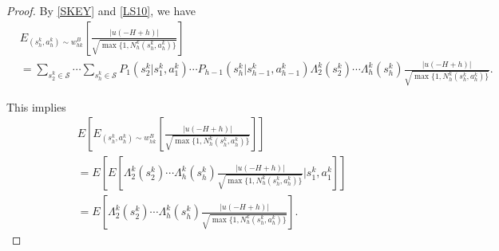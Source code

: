 \documentclass[11pt]{article}
\newcommand{\1}{\mathbbm{1}}
\begin{document}
\begin{proof}
By \eqref{SKEY} and \eqref{LS10}, we have %
\begin{align}\label{SS28}
&E_{(s_h^k,a_h^k)\sim w_{hk}^{B}}\left [\frac{\vert u(-H+h)\vert}{\sqrt{\max\{1,N_h^k(s_h^k,a_h^k)\}}}\right ]\nonumber\\
&=\sum_{s_{2}^k\in\mathcal{S}}\cdots \sum_{s_{h}^k\in \mathcal{S}}P_{1}(s_{2}^k\vert s_1^k,a_1^k)\cdots P_{h-1}(s_{h}^k\vert s_{h-1}^k,a_{h-1}^k)\Lambda_2^k(s_2^k)\cdots \Lambda_h^k(s_h^k)\frac{\vert u(-H+h)\vert}{\sqrt{\max\{1,N_h^k(s_h^k,a_h^k)\}}}.
\end{align}

This implies
\begin{align*}
&E\left [ E_{(s_h^k,a_h^k)\sim w_{hk}^{B}}\left [\frac{\vert u(-H+h)\vert}{\sqrt{\max\{1,N_h^k(s_h^k,a_h^k)\}}}\right ]\right]\\
&= E\left[ E\left [\Lambda_2^k(s_2^k)\cdots\Lambda_h^k(s_h^k)\frac{\vert u(-H+h)\vert}{\sqrt{\max\{1,N_h^k(s_h^k,a_h^k)\}}}\Bigg \vert s_1^k,a_1^k\right ]\right]\\
&= E\left [\Lambda_2^k(s_2^k)\cdots\Lambda_h^k(s_h^k)\frac{\vert u(-H+h)\vert}{\sqrt{\max\{1,N_h^k(s_h^k,a_h^k)\}}}\right ].
\end{align*}






\end{proof}
\end{document}
